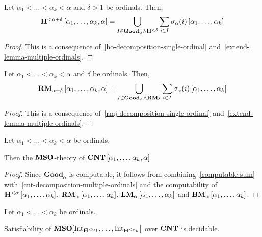 \begin{lemma}\label{ho-decomposition-multiple-ordinals}
  Let $\alpha_1 < \ldots < \alpha_k < \alpha$ and $\delta > 1$ be ordinals. Then,
  \[
    \mathbf{H}^{< \alpha + \delta} \left[ {\alpha_1, \ldots, \alpha_k, \alpha} \right]
    = \bigcup_{I \in \mathbf{Good}_{\alpha} \wedge \mathbf{H}^{< \delta}}
    \sum_{i \in I} \sigma_{\alpha}(i) \left[ {\alpha_1, \ldots, \alpha_k} \right]
  \]
\end{lemma}

\begin{proof}
  This is a consequence of~\cref{ho-decomposition-single-ordinal}
  and~\cref{extend-lemma-multiple-ordinals}.
\end{proof}

\begin{lemma}\label{rmj-decomposition-multiple-ordinals}
  Let $\alpha_1 < \ldots < \alpha_k < \alpha$ and $\delta$ be ordinals.
  Then,
  \[
    \mathbf{RM}_{\alpha + \delta} \left[ {\alpha_1, \ldots, \alpha_k, \alpha} \right]
    = \bigcup_{I \in \mathbf{Good}_{\alpha} \wedge \mathbf{RM}_{\delta}}
    \sum_{i \in I} \sigma_{\alpha}(i) \left[ {\alpha_1, \ldots, \alpha_k} \right]
  \]
\end{lemma}

\begin{proof}
  This is a consequence of~\cref{rmj-decomposition-single-ordinal}
  and~\cref{extend-lemma-multiple-ordinals}.
\end{proof}

\begin{lemma}\label{cnt-decidable-multiple-ordinals}
  Let $\alpha_1 < \ldots < \alpha_k < \alpha$ be ordinals.

  Then the $\mathbf{MSO}$-theory of $\mathbf{CNT} \left[ {\alpha_1, \ldots, \alpha_k, \alpha} \right]$
\end{lemma}

\begin{proof}
  Since $\mathbf{Good}_{\alpha}$ is computable,
  it follows from combining~\cref{computable-sum}
  with~\cref{cnt-decomposition-multiple-ordinals} and the computability
  of $\mathbf{H}^{< \alpha} \left[ {\alpha_1, \ldots, \alpha_k} \right]$,
  $\mathbf{RM}_{\alpha} \left[ {\alpha_1, \ldots, \alpha_k} \right]$,
  $\mathbf{LM}_{\alpha} \left[ {\alpha_1, \ldots, \alpha_k} \right]$ and
  $\mathbf{BM}_{\alpha} \left[ {\alpha_1, \ldots, \alpha_k} \right]$.
\end{proof}

\begin{theorem}\label{multiple-ordinals-satisfiability}
  Let $\alpha_1 < \ldots < \alpha_k$ be ordinals.

  Satisfiability of $\mathbf{MSO}[\mathrm{Int}_{\mathbf{H}^{< \alpha_1}}, \ldots, \mathrm{Int}_{\mathbf{H}^{< \alpha_k}}]$
  over $\mathbf{CNT}$ is decidable.
\end{theorem}

